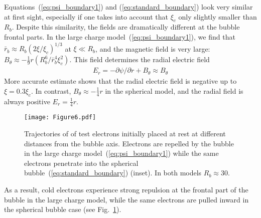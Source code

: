 \documentclass[twocolumn,showpacs,aip]{revtex4}
\begin{document}
Equations~(\ref{eq:psi_boundary1}) and (\ref{eq:standard_boundary}) look very similar at first sight, especially if one takes into account that $\xi_c$ only slightly smaller than $R_b$. Despite this similarity, the fields are dramatically different at the bubble frontal parts. In the large charge model~(\ref{eq:psi_boundary1}), we find that    $\bar{r}_b\approx R_b(2\xi/\xi_c)^{1/3}$ at $\xi\ll R_b$, 
and the magnetic field
is very large: 
$B_{\theta}\approx -\frac{1}{9}r(R_b^6/\bar{r}_b^4\xi_c^2)$. %
This field determines the radial electric field
\begin{eqnarray}
E_r=-\partial \psi/\partial r+B_{\theta}\approx B_{\theta}
\label{eq:E_r_in_bubble}
\end{eqnarray}
More accurate estimate shows that the radial electric field is negative up to   $\xi=0.3\xi_c$.  In contrast,  $B_{\theta}\approx -\frac{1}{4}r$ in the spherical model, and the radial field is always positive $E_r=\frac{1}{4}r$. %
%
\begin{figure}[t!]
\centering
	\texttt{[image: Figure6.pdf]}
   \caption{Trajectories of of test electrons initially placed at rest at different distances from the bubble axis.  Electrons are  repelled by the bubble in the large charge model~(\ref{eq:psi_boundary1}) while   the same electrons  penetrate into the spherical bubble~(\ref{eq:standard_boundary}) (inset). In both models $R_b\approx 30$.}
	\label{fig:test_electrons}
\end{figure}
As a result,   cold electrons experience strong repulsion  at the frontal part of the bubble  in the large charge model,  %
while the same electrons are pulled inward in  the spherical bubble case (see Fig.~\ref{fig:test_electrons}).


\end{document}
